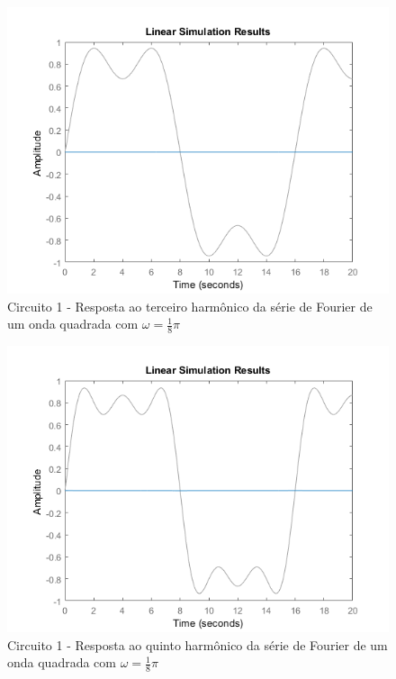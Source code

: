 \documentclass[a4paper, 12pt]{article}
\begin{document}
			\begin{figure}[!ht]
				\centering
				\includegraphics[scale=0.71]{img/1k_circ1.png}
				\caption{Circuito 1 - Resposta ao terceiro harmônico da série de Fourier de um onda quadrada com $\omega = \frac{1}{8}\pi$}
			\end{figure}
			\begin{figure}[!ht]
				\centering
				\includegraphics[scale=0.71]{img/1l_circ1.png}
				\caption{Circuito 1 - Resposta ao quinto harmônico da série de Fourier de um onda quadrada com $\omega = \frac{1}{8}\pi$}
			\end{figure}
\end{document}
